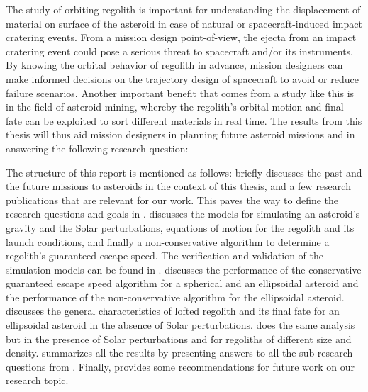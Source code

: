 %
\newline\newline
%
The study of orbiting regolith is important for understanding the displacement of material on surface of the asteroid in case of natural or spacecraft-induced impact cratering events. From a mission design point-of-view, the ejecta from an impact cratering event could pose a serious threat to spacecraft and/or its instruments. By knowing the orbital behavior of regolith in advance, mission designers can make informed decisions on the trajectory design of spacecraft to avoid or reduce failure scenarios. Another important benefit that comes from a study like this is in the field of asteroid mining, whereby the regolith's orbital motion and final fate can be exploited to sort different materials in real time. The results from this thesis will thus aid mission designers in planning future asteroid missions and in answering the following research question:
\vspace{5mm}
\begin{center}
\end{center}
\vspace{5mm}
The structure of this report is mentioned as follows:  briefly discusses the past and the future missions to asteroids in the context of this thesis, and a few research publications that are relevant for our work. This paves the way to define the research questions and goals in .  discusses the models for simulating an asteroid's gravity and the Solar perturbations, equations of motion for the regolith and its launch conditions, and finally a non-conservative algorithm to determine a regolith's guaranteed escape speed. The verification and validation of the simulation models can be found in .  discusses the performance of the conservative guaranteed escape speed algorithm for a spherical and an ellipsoidal asteroid and the performance of the non-conservative algorithm for the ellipsoidal asteroid.  discusses the general characteristics of lofted regolith and its final fate for an ellipsoidal asteroid in the absence of Solar perturbations.  does the same analysis but in the presence of Solar perturbations and for regoliths of different size and density.  summarizes all the results by presenting answers to all the sub-research questions from . Finally,  provides some recommendations for future work on our research topic.

